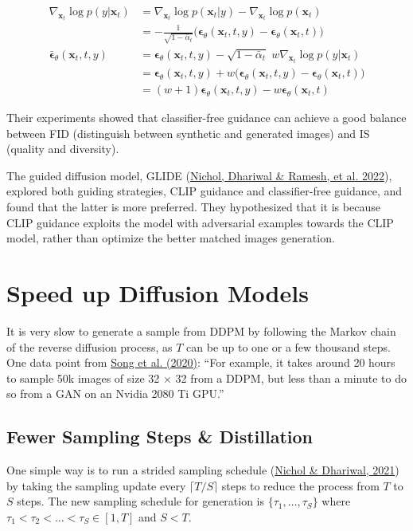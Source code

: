 \documentclass[12pt]{article}
\begin{document}
\[
\begin{aligned}
\nabla_{\mathbf{x}_t} \log p(y \vert \mathbf{x}_t)
&= \nabla_{\mathbf{x}_t} \log p(\mathbf{x}_t \vert y) - \nabla_{\mathbf{x}_t} \log p(\mathbf{x}_t) \\
&= - \frac{1}{\sqrt{1 - \bar{\alpha}_t}}\Big( \boldsymbol{\epsilon}_\theta(\mathbf{x}_t, t, y) - \boldsymbol{\epsilon}_\theta(\mathbf{x}_t, t) \Big) \\
\bar{\boldsymbol{\epsilon}}_\theta(\mathbf{x}_t, t, y)
&= \boldsymbol{\epsilon}_\theta(\mathbf{x}_t, t, y) - \sqrt{1 - \bar{\alpha}_t} \; w \nabla_{\mathbf{x}_t} \log p(y \vert \mathbf{x}_t) \\
&= \boldsymbol{\epsilon}_\theta(\mathbf{x}_t, t, y) + w \big(\boldsymbol{\epsilon}_\theta(\mathbf{x}_t, t, y) - \boldsymbol{\epsilon}_\theta(\mathbf{x}_t, t) \big) \\
&= (w+1) \boldsymbol{\epsilon}_\theta(\mathbf{x}_t, t, y) - w \boldsymbol{\epsilon}_\theta(\mathbf{x}_t, t)
\end{aligned}
\]

Their experiments showed that classifier-free guidance can achieve a good balance between FID (distinguish between synthetic and generated images) and IS (quality and diversity).

The guided diffusion model, GLIDE (\href{https://arxiv.org/abs/2112.10741}{Nichol, Dhariwal \& Ramesh, et al. 2022}), explored both guiding strategies, CLIP guidance and classifier-free guidance, and found that the latter is more preferred. They hypothesized that it is because CLIP guidance exploits the model with adversarial examples towards the CLIP model, rather than optimize the better matched images generation.

\section{Speed up Diffusion Models}
It is very slow to generate a sample from DDPM by following the Markov chain of the reverse diffusion process, as $T$ can be up to one or a few thousand steps. One data point from \href{https://arxiv.org/abs/2010.02502}{Song et al. (2020)}: ``For example, it takes around 20 hours to sample 50k images of size 32 × 32 from a DDPM, but less than a minute to do so from a GAN on an Nvidia 2080 Ti GPU.''

\subsection{Fewer Sampling Steps \& Distillation}
One simple way is to run a strided sampling schedule (\href{https://arxiv.org/abs/2102.09672}{Nichol \& Dhariwal, 2021}) by taking the sampling update every $\lceil T/S \rceil$ steps to reduce the process from $T$ to $S$ steps. The new sampling schedule for generation is $\{\tau_1, \dots, \tau_S\}$  where $\tau_1 < \tau_2 < \dots < \tau_S \in [1, T]$ and $S < T$.
\end{document}
